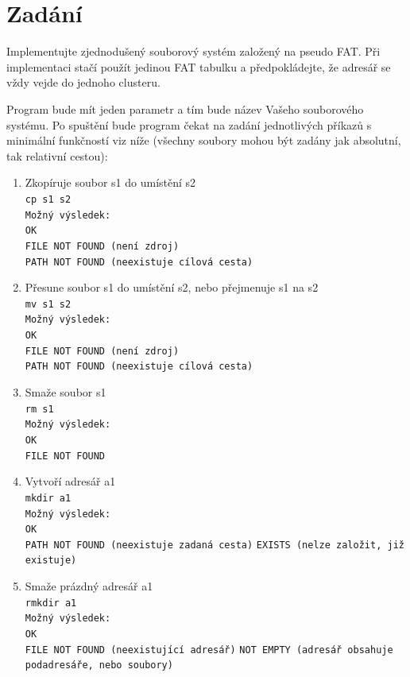 \documentclass[12pt]{report}
\begin{document}
	\section*{Zadání}
	\par Implementujte zjednodušený souborový systém založený na pseudo FAT. Při implementaci stačí použít jedinou FAT tabulku a předpokládejte, že adresář se vždy vejde do jednoho clusteru.
	\par Program bude mít jeden parametr a tím bude název Vašeho souborového systému. Po spuštění bude program čekat na zadání jednotlivých příkazů s minimální funkčností viz níže (všechny soubory mohou být zadány jak absolutní, tak relativní cestou):
	\begin{enumerate}
		\item Zkopíruje soubor s1 do umístění s2\\
		\texttt{cp s1 s2}\\
		\texttt{Možný výsledek:}\\
		\texttt{OK}\\
		\texttt{FILE NOT FOUND (není zdroj)}\\
		\texttt{PATH NOT FOUND (neexistuje cílová cesta)}
		
		\item Přesune soubor s1 do umístění s2, nebo přejmenuje s1 na s2\\
		\texttt{mv s1 s2}\\
		\texttt{Možný výsledek:}\\
		\texttt{OK}\\
		\texttt{FILE NOT FOUND (není zdroj)}\\
		\texttt{PATH NOT FOUND (neexistuje cílová cesta)}
		
		\item Smaže soubor s1\\
		\texttt{rm s1}\\
		\texttt{Možný výsledek:}\\
		\texttt{OK}\\
		\texttt{FILE NOT FOUND}
		
		\item Vytvoří adresář a1\\
		\texttt{mkdir a1}\\
		\texttt{Možný výsledek:}\\
		\texttt{OK}\\
		\texttt{PATH NOT FOUND (neexistuje zadaná cesta)}
		\texttt{EXISTS (nelze založit, již existuje)}
		
		\item Smaže prázdný adresář a1\\
		\texttt{rmkdir a1}\\
		\texttt{Možný výsledek:}\\
		\texttt{OK}\\
		\texttt{FILE NOT FOUND (neexistující adresář)}
		\texttt{NOT EMPTY (adresář obsahuje podadresáře, nebo soubory)}
		

\end{enumerate}
\end{document}
